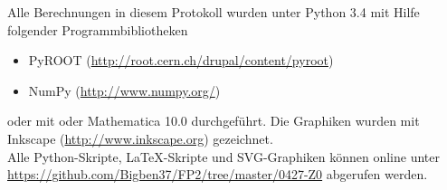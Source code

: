 \documentclass[12pt, a4paper]{scrartcl}
\title{\exptitle}
\subtitle{Fortgeschrittenen-Praktikum 1}
\author{Moritz Bitterling und Benjamin Rottler \\ Universität Freiburg}
\date{\expdate}
\numberwithin{equation}{section} %
\numberwithin{table}{section}    %
\begin{document}
\hypersetup{pageanchor=false} %

\thispagestyle{empty}

\newpage
Alle Berechnungen in diesem Protokoll wurden unter Python 3.4 mit Hilfe folgender Programmbibliotheken
\begin{itemize}
  \item PyROOT (\url{http://root.cern.ch/drupal/content/pyroot})
  \item NumPy (\url{http://www.numpy.org/})
\end{itemize}
oder mit oder Mathematica 10.0 durchgeführt.
Die Graphiken wurden mit Inkscape (\url{http://www.inkscape.org}) gezeichnet.\\[\baselineskip]
Alle Python-Skripte, \LaTeX-Skripte und SVG-Graphiken können online unter \\
\url{https://github.com/Bigben37/FP2/tree/master/0427-Z0} abgerufen werden.
\thispagestyle{empty}

\newpage
\tableofcontents
\thispagestyle{empty}

\newpage
\hypersetup{pageanchor=true} %
\setcounter{page}{1} %

 





\newpage



\appendix

\end{document}
